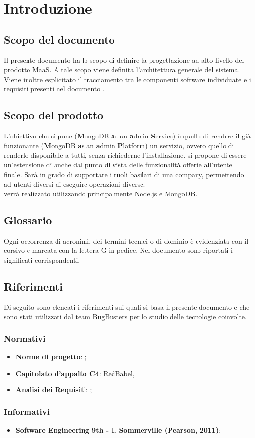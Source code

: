\section{Introduzione}
\subsection{Scopo del documento}
Il presente documento ha lo scopo di definire la progettazione ad alto livello del prodotto MaaS. A tale scopo viene definita l'architettura generale del sistema. Viene inoltre esplicitato il tracciamento tra le componenti software individuate e i requisiti presenti nel documento \AnalisiDeiRequisiti. 

\subsection{Scopo del prodotto}
L'obiettivo che si pone  (\textbf{M}ongoDB \textbf{a}s an \textbf{a}dmin \textbf{S}ervice) è quello di rendere il già funzionante  (\textbf{M}ongoDB \textbf{a}s an \textbf{a}dmin \textbf{P}latform) un servizio, ovvero quello di renderlo disponibile a tutti, senza richiederne l'installazione.  si propone di essere un'estensione di  anche dal punto di vista delle funzionalità offerte all'utente finale. Sarà in grado di supportare i ruoli basilari di una company, permettendo ad utenti diversi di eseguire operazioni diverse. \\
 verrà realizzato utilizzando principalmente Node.js e MongoDB.

\subsection{Glossario}
Ogni occorrenza di acronimi, dei termini tecnici o di dominio è evidenziata con il corsivo e marcata con la lettera G in pedice. Nel documento \Glossario sono riportati i significati corrispondenti.

\subsection{Riferimenti}
Di seguito sono elencati i riferimenti sui quali si basa il presente documento e che sono stati utilizzati dal team BugBusters per lo studio delle tecnologie coinvolte.

\subsubsection{Normativi}
\begin{itemize}
\item \textbf{Norme di progetto}: \NormeDiProgetto;
\item \textbf{Capitolato d'appalto C4}: RedBabel,  
\item \textbf{Analisi dei Requisiti}: \AnalisiDeiRequisiti;
\end{itemize}
\subsubsection{Informativi}
\begin{itemize}
\item \textbf{Software Engineering 9th - I. Sommerville (Pearson, 2011)};
\end{itemize}
